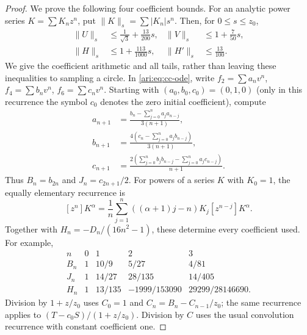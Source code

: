 \begin{proof}
We prove the following four coefficient bounds. For an analytic
power series $K=\sum K_nz^n$, put
$\|K\|_s=\sum|K_n|s^n$. Then, for $0\le s\le z_0$,
\begin{equation}\label{ari:eq:cc-norms}
 \begin{aligned}
 \|U\|_s&\le\frac1{\sqrt3}+\frac{13}{200}s,&
 \|V\|_s&\le1+\frac7{50}s,\\
 \|H\|_s&\le1+\frac{113}{1000}s,&
 \|H'\|_s&\le\frac{13}{100}.
 \end{aligned}
\end{equation}
We give the coefficient arithmetic and all tails, rather than
leaving these inequalities to sampling a circle. In
\eqref{ari:eq:cc-ode}, write $f_2=\sum a_nv^n$,
$f_4=\sum b_nv^n$, $f_6=\sum c_nv^n$. Starting with
$(a_0,b_0,c_0)=(0,1,0)$ (only in this recurrence the symbol
$c_0$ denotes the zero initial coefficient), compute
\begin{equation}\label{ari:eq:cc-recurrence}
 \begin{aligned}
 a_{n+1}&=\frac{b_n-\sum_{j=0}^na_ja_{n-j}}{3(n+1)},\\
 b_{n+1}&=\frac{4(c_n-\sum_{j=0}^na_jb_{n-j})}{3(n+1)},\\
 c_{n+1}&=\frac{2(\sum_{j=0}^nb_jb_{n-j}-
                          \sum_{j=0}^na_jc_{n-j})}{n+1}.
 \end{aligned}
\end{equation}
Thus $B_n=b_{2n}$ and $J_n=c_{2n+1}/2$. For powers of a series
$K$ with $K_0=1$, the equally elementary recurrence is
\begin{equation}\label{ari:eq:cc-power}
 [z^n]K^\alpha=\frac1n\sum_{j=1}^n
                 ((\alpha+1)j-n)K_j[z^{n-j}]K^\alpha.
\end{equation}
Together with $H_n=-D_n/(16n^2-1)$, these determine every
coefficient used. For example,
\[
 \begin{array}{c|rrrr}
 n&0&1&2&3\\ \hline
 B_n&1&10/9&5/27&4/81\\
 J_n&1&14/27&28/135&14/405\\
 H_n&1&13/135&-1999/153090&29299/28146690.
 \end{array}
\]
Division by $1+z/z_0$ uses $C_0=1$ and
$C_n=B_n-C_{n-1}/z_0$; the same recurrence applies to
$(T-c_0S)/(1+z/z_0)$. Division by $C$ uses the usual
convolution recurrence with constant coefficient one.


\end{proof}
